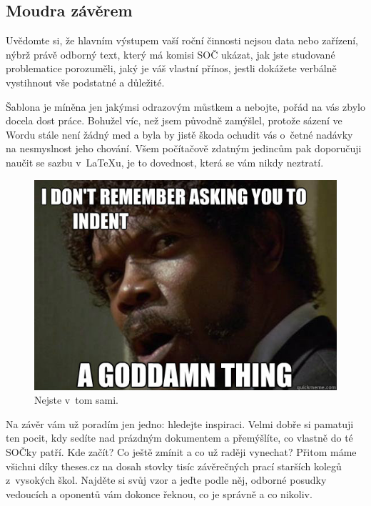 \documentclass{template/socthesis}
\begin{document}
\subsection{Moudra závěrem}
Uvědomte si, že hlavním výstupem vaší roční činnosti nejsou data nebo zařízení, nýbrž právě odborný text, který má komisi SOČ ukázat, jak jste studované problematice porozuměli, jaký je váš vlastní přínos, jestli dokážete verbálně vystihnout vše podstatné a důležité. 

Šablona je míněna jen jakýmsi odrazovým můstkem a nebojte, pořád na vás zbylo docela dost práce. Bohužel víc, než jsem původně zamýšlel, protože sázení ve Wordu stále není žádný med a byla by jistě škoda ochudit vás o~četné nadávky na nesmyslnost jeho chování. Všem počítačově zdatným jedincům pak doporučuji naučit se sazbu v~LaTeXu, je to dovednost, která se vám nikdy neztratí.

\begin{figure}[h]
  	\centering
 	\includegraphics[width=\textwidth]{img/pulp.jpg}
 	\caption{Nejste v~tom sami.}
\end{figure}

Na závěr vám už poradím jen jedno: hledejte inspiraci. Velmi dobře si pamatuji ten pocit, kdy sedíte nad prázdným dokumentem a přemýšlíte, co vlastně do té SOČky patří. Kde začít? Co ještě zmínit a co už raději vynechat? Přitom máme všichni díky theses.cz na dosah stovky tisíc závěrečných prací starších kolegů z~vysokých škol. Najděte si svůj vzor a jeďte podle něj, odborné posudky vedoucích a oponentů vám dokonce řeknou, co je správně a co nikoliv. 
\end{document}
